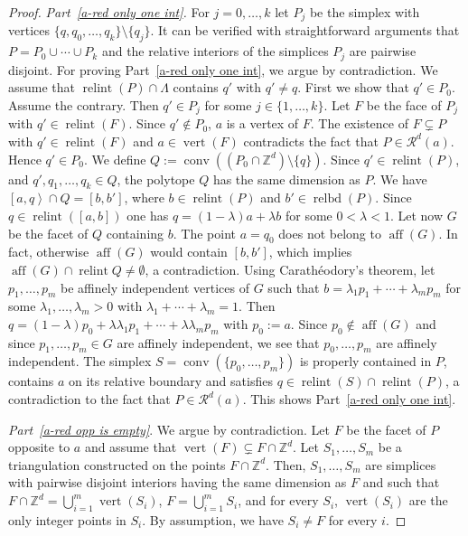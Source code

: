 \documentclass[a4paper]{article}
\theoremstyle{plain}
\begin{document}
\begin{proof}
\emph{Part~\ref{a-red only one int}.}
For $j=0,\ldots,k$ let $P_j$ be the simplex with vertices
$\{q,q_0,\ldots,q_k\} \setminus \{q_j\}$.
It can be verified with straightforward arguments that
$P = P_0 \cup \cdots \cup P_k$ and the relative interiors of
the simplices $P_j$ are pairwise disjoint.
For proving Part~\ref{a-red only one int}, we argue by
contradiction.
We assume that ${{\mathop{\mathrm{{relint}}}}}(P) \cap \Lambda$ contains $q'$ with
$q' \ne q$.
First we show that $q' \in P_0$.
Assume the contrary.
Then $q' \in P_j$ for some $j \in \{1, \ldots, k\}$.
Let $F$ be the face of $P_j$ with $q' \in {{\mathop{\mathrm{{relint}}}}}(F)$.
Since $q' \not\in P_0$, $a$ is a vertex of $F$.
The existence of $F \varsubsetneq P$ with $q' \in
{{\mathop{\mathrm{{relint}}}}}(F)$ and $a \in {{\mathop{\mathrm{{vert}}}}}(F)$ contradicts the fact that $P
\in {\mathcal{R}}^d(a)$.
Hence $q' \in P_0$.
We define $Q:= {{\mathop{\mathrm{{conv}}}}} ((P_0 \cap {\mathbb{Z}}^d) \setminus
\{q\})$.
Since $q' \in {{\mathop{\mathrm{{relint}}}}}(P)$, and $q', q_1,\ldots,q_k \in Q$,
the polytope $Q$ has the same dimension as $P$.
We have ${\left[{a,q}\right>} \cap Q = [b,b']$, where $b \in
{{\mathop{\mathrm{{relint}}}}}(P)$ and $b' \in {{\mathop{\mathrm{{relbd}}}}}(P)$.
Since $q \in {{\mathop{\mathrm{{relint}}}}}([a,b])$ one has $q = (1-\lambda)a +
\lambda b$ for some $0 < \lambda < 1$.
Let now $G$ be the facet of $Q$ containing $b$.
The point $a=q_0$ does not belong to ${{\mathop{\mathrm{{aff}}}}}(G)$.
In fact, otherwise ${{\mathop{\mathrm{{aff}}}}}(G)$ would contain $[b,b']$, which
implies ${{\mathop{\mathrm{{aff}}}}} (G) \cap {{\mathop{\mathrm{{relint}}}}} Q \ne \emptyset$, a
contradiction.
Using Carath\'eodory's theorem, let $p_1,\ldots,p_m$ be
affinely independent vertices of $G$ such that $b=\lambda_1
p_1 + \cdots + \lambda_m p_m$ for some
$\lambda_1,\ldots,\lambda_m > 0$ with $\lambda_1 + \cdots +
\lambda_m = 1$.
Then $q = (1-\lambda)p_0 + \lambda \lambda_1 p_1 + \cdots +
\lambda \lambda_m p_m$ with $p_0 := a$.
Since $p_0 \not \in {{\mathop{\mathrm{{aff}}}}}(G)$ and since $p_1, \ldots, p_m \in
G$ are affinely independent, we see that $p_0, \ldots, p_m$
are affinely independent.
The simplex $S = {{\mathop{\mathrm{{conv}}}}}(\{p_0, \ldots, p_m\})$ is properly
contained in $P$, contains $a$ on its relative boundary and
satisfies $q \in {{\mathop{\mathrm{{relint}}}}}(S) \cap {{\mathop{\mathrm{{relint}}}}}(P)$, a
contradiction to the fact that $P \in {\mathcal{R}}^d(a)$.
This shows Part~\ref{a-red only one int}.

\emph{Part~\ref{a-red opp is empty}}.
We argue by contradiction.
Let $F$ be the facet of $P$ opposite to $a$ and assume that
${{\mathop{\mathrm{{vert}}}}}(F) \varsubsetneq F \cap {\mathbb{Z}}^d$.
Let $S_1, \ldots, S_m$ be a triangulation constructed on the
points $F \cap {\mathbb{Z}}^d$.
Then, $S_1, \ldots, S_m$ are simplices with pairwise
disjoint interiors having the same dimension as $F$ and such
that $F \cap {\mathbb{Z}}^d = \bigcup_{i=1}^m {{\mathop{\mathrm{{vert}}}}}(S_i)$, $F =
\bigcup_{i=1}^m S_i$, and for every $S_i$, ${{\mathop{\mathrm{{vert}}}}}(S_i)$ are the
only integer points in $S_i$.
By assumption, we have $S_i \ne F$ for every $i$.


\end{proof}
\end{document}

